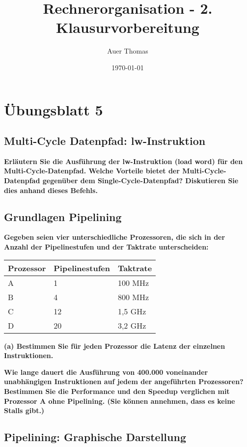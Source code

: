 \documentclass[11pt]{article}
\title{Rechnerorganisation - 2. Klausurvorbereitung}
\author{Auer Thomas}
\date{\today}
\begin{document}
\maketitle
\tableofcontents
\graphicspath{{graphics/}}

\section{Übungsblatt 5}
    \subsection{Multi-Cycle Datenpfad: lw-Instruktion}
    \textbf{Erläutern Sie die Ausführung der lw-Instruktion (load word) für den Multi-Cycle-Datenpfad.
    Welche Vorteile bietet der Multi-Cycle-Datenpfad gegenüber dem Single-Cycle-Datenpfad?
    Diskutieren Sie dies anhand dieses Befehls.}

    \subsection{Grundlagen Pipelining}
    \textbf{Gegeben seien vier unterschiedliche Prozessoren, die sich in der Anzahl der Pipelinestufen und
    der Taktrate unterscheiden:\\}
    \begin{center}
        \begin{tabular}{l|l|l}
        Prozessor & Pipelinestufen & Taktrate \\\hline
        A & 1 & 100 MHz \\
        B & 4 & 800 MHz \\
        C & 12 & 1,5 GHz \\
        D & 20 & 3,2 GHz \\
        \end{tabular}
    \end{center}
    \textbf{(a) Bestimmen Sie für jeden Prozessor die Latenz der einzelnen Instruktionen.}
    
    \textbf{Wie lange dauert die Ausführung von 400.000 voneinander unabhängigen Instruktionen
    auf jedem der angeführten Prozessoren? Bestimmen Sie die Performance und den
    Speedup verglichen mit Prozessor A ohne Pipelining. (Sie können annehmen, dass es
    keine Stalls gibt.)}

    \subsection{Pipelining: Graphische Darstellung}
\end{document}
